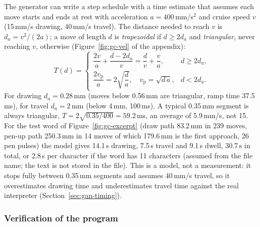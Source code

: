 The generator can write a step schedule with a time estimate that assumes each move starts and ends at rest with acceleration $a=400$\,mm/s$^2$ and cruise speed $v$ (15\,mm/s drawing, 40\,mm/s travel).
The distance needed to reach $v$ is $d_a=v^2/(2a)$; a move of length $d$ is \emph{trapezoidal} if $d\ge2d_a$ and \emph{triangular}, never reaching $v$, otherwise (Figure~\ref{fig:gc-vel} of the appendix):
\begin{equation}
T(d)=\begin{cases}\dfrac{2v}{a}+\dfrac{d-2d_a}{v}=\dfrac{d}{v}+\dfrac{v}{a},&d\ge2d_a,\\[2mm]\dfrac{2v_{\mathrm p}}{a}=2\sqrt{\dfrac{d}{a}},\quad v_{\mathrm p}=\sqrt{d\,a},&d<2d_a.\end{cases}
\label{eq:gc-trap}
\end{equation}
For drawing $d_a=0.28$\,mm (moves below 0.56\,mm are triangular, ramp time 37.5\,ms), for travel $d_a=2$\,mm (below 4\,mm, 100\,ms).
A typical 0.35\,mm segment is always triangular, $T=2\sqrt{0.35/400}=59.2$\,ms, an average of 5.9\,mm/s, not 15.
For the test word of Figure~\ref{fig:gc-excerpt} (draw path 83.2\,mm in 239 moves, pen-up path 250.3\,mm in 14 moves of which 179.6\,mm is the first approach, 26 pen pulses) the model gives 14.1\,s drawing, 7.5\,s travel and 9.1\,s dwell, 30.7\,s in total, or 2.8\,s per character if the word has 11 characters (assumed from the file name; the text is not stored in the file).
This is a model, not a measurement: it stops fully between 0.35\,mm segments and assumes 40\,mm/s travel, so it overestimates drawing time and underestimates travel time against the real interpreter (Section~\ref{sec:gan-timing}).

\subsubsection{Verification of the program}
\label{sec:gc-verify}

